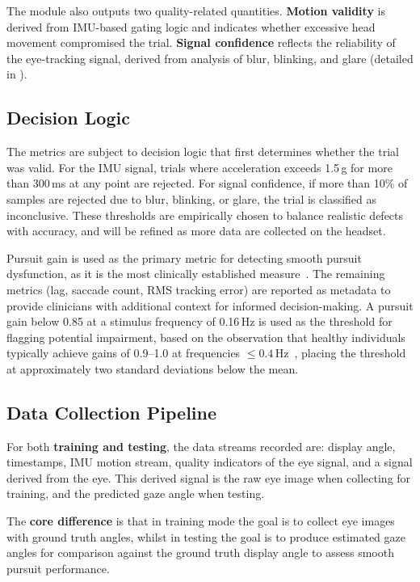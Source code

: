 The module also outputs two quality-related quantities. \textbf{Motion validity} is derived from IMU-based gating logic and indicates whether excessive head movement compromised the trial. \textbf{Signal confidence} reflects the reliability of the eye-tracking signal, derived from analysis of blur, blinking, and glare (detailed in ).

\subsection{Decision Logic}

The metrics are subject to decision logic that first determines whether the trial was valid. For the IMU signal, trials where acceleration exceeds 1.5\,g for more than 300\,ms at any point are rejected. For signal confidence, if more than 10\% of samples are rejected due to blur, blinking, or glare, the trial is classified as inconclusive. These thresholds are empirically chosen to balance realistic defects with accuracy, and will be refined as more data are collected on the headset.

Pursuit gain is used as the primary metric for detecting smooth pursuit dysfunction, as it is the most clinically established measure~\cite{leigh2015neurology}. The remaining metrics (lag, saccade count, RMS tracking error) are reported as metadata to provide clinicians with additional context for informed decision-making. A pursuit gain below 0.85 at a stimulus frequency of 0.16\,Hz is used as the threshold for flagging potential impairment, based on the observation that healthy individuals typically achieve gains of 0.9--1.0 at frequencies $\leq 0.4$\,Hz~\cite{meyer2020smoothpursuit}, placing the threshold at approximately two standard deviations below the mean.

\subsection{Data Collection Pipeline}
\label{sec:data-pipeline}

For both \textbf{training and testing}, the data streams recorded are: display angle, timestamps, IMU motion stream, quality indicators of the eye signal, and a signal derived from the eye. This derived signal is the raw eye image when collecting for training, and the predicted gaze angle when testing.

The \textbf{core difference} is that in training mode the goal is to collect eye images with ground truth angles, whilst in testing the goal is to produce estimated gaze angles for comparison against the ground truth display angle to assess smooth pursuit performance.

